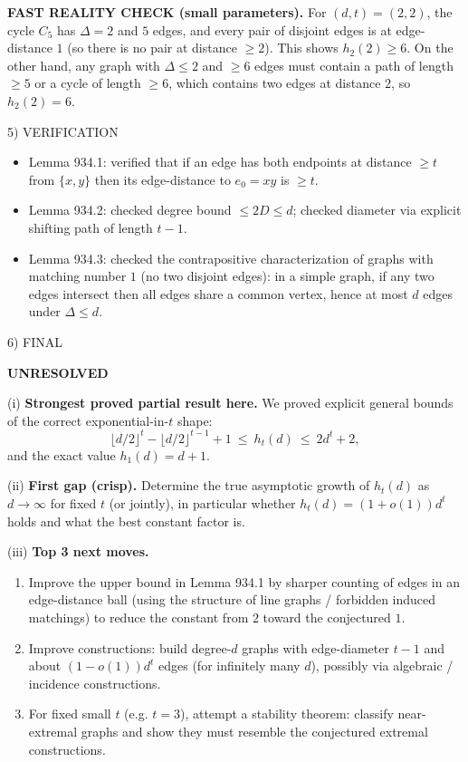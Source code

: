 \medskip
\textbf{FAST REALITY CHECK (small parameters).}
For $(d,t)=(2,2)$, the cycle $C_5$ has $\Delta=2$ and $5$ edges, and every pair of disjoint edges is at edge-distance $1$ (so there is no pair at distance $\ge 2$). This shows $h_2(2)\ge 6$. On the other hand, any graph with $\Delta\le 2$ and $\ge 6$ edges must contain a path of length $\ge 5$ or a cycle of length $\ge 6$, which contains two edges at distance $2$, so $h_2(2)=6$.

5) VERIFICATION

\begin{itemize}
\item Lemma 934.1: verified that if an edge has both endpoints at distance $\ge t$ from $\{x,y\}$ then its edge-distance to $e_0=xy$ is $\ge t$.
\item Lemma 934.2: checked degree bound $\le 2D\le d$; checked diameter via explicit shifting path of length $t-1$.
\item Lemma 934.3: checked the contrapositive characterization of graphs with matching number $1$ (no two disjoint edges): in a simple graph, if any two edges intersect then all edges share a common vertex, hence at most $d$ edges under $\Delta\le d$.
\end{itemize}

6) FINAL

\textbf{UNRESOLVED}

(i) \textbf{Strongest proved partial result here.}
We proved explicit general bounds of the correct exponential-in-$t$ shape:
\[
\lfloor d/2\rfloor^t - \lfloor d/2\rfloor^{t-1} + 1\ \le\ h_t(d)\ \le\ 2d^t+2,
\]
and the exact value $h_1(d)=d+1$.

(ii) \textbf{First gap (crisp).}
Determine the true asymptotic growth of $h_t(d)$ as $d\to\infty$ for fixed $t$ (or jointly), in particular whether $h_t(d)=(1+o(1))d^t$ holds and what the best constant factor is.

(iii) \textbf{Top 3 next moves.}
\begin{enumerate}
\item Improve the upper bound in Lemma 934.1 by sharper counting of edges in an edge-distance ball (using the structure of line graphs / forbidden induced matchings) to reduce the constant from $2$ toward the conjectured $1$.
\item Improve constructions: build degree-$d$ graphs with edge-diameter $t-1$ and about $(1-o(1))d^t$ edges (for infinitely many $d$), possibly via algebraic / incidence constructions.
\item For fixed small $t$ (e.g. $t=3$), attempt a stability theorem: classify near-extremal graphs and show they must resemble the conjectured extremal constructions.
\end{enumerate}

